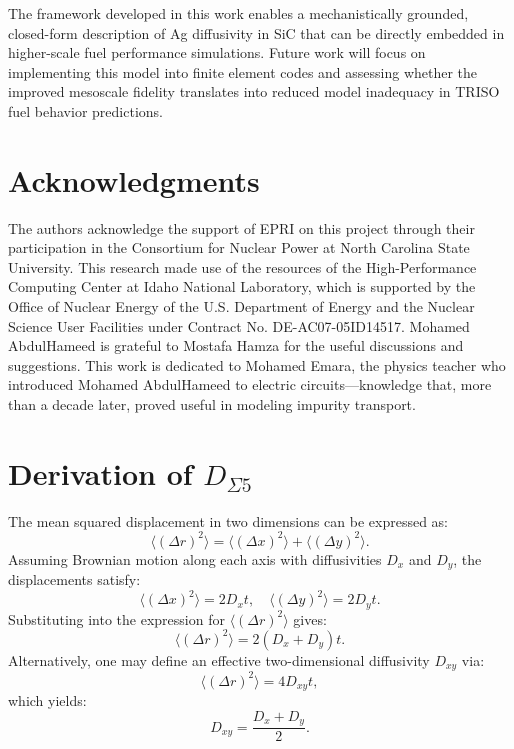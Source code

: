 \documentclass[%
preprint,
amsmath,amssymb,
aps,
]{revtex4-2}
\newcommand{\?}{\stackrel{?}{=}}
\begin{document}
The framework developed in this work enables a mechanistically grounded, closed-form description of Ag diffusivity in SiC that can be directly embedded in higher-scale fuel performance simulations. Future work will focus on implementing this model into finite element codes and assessing whether the improved mesoscale fidelity translates into reduced model inadequacy in TRISO fuel behavior predictions.

\section{Acknowledgments}

The authors acknowledge the support of EPRI on this project through their participation in the Consortium for Nuclear Power at North Carolina State University. This research made use of the resources of the High-Performance Computing Center at Idaho National Laboratory, which is supported by the Office of Nuclear Energy of the U.S. Department of Energy and the Nuclear Science User Facilities under Contract No. DE-AC07-05ID14517. Mohamed AbdulHameed is grateful to Mostafa Hamza for the useful discussions and suggestions. This work is dedicated to Mohamed Emara, the physics teacher who introduced Mohamed AbdulHameed to electric circuits---knowledge that, more than a decade later, proved useful in modeling impurity transport.

\appendix

\section{Derivation of $D_{\Sigma 5}$}
\label{app}

The mean squared displacement in two dimensions can be expressed as:
\begin{equation}
\langle (\Delta r)^2 \rangle = \langle (\Delta x)^2 \rangle + \langle (\Delta y)^2 \rangle.
\end{equation}
Assuming Brownian motion along each axis with diffusivities $D_x$ and $D_y$, the displacements satisfy:
\begin{equation}
\langle (\Delta x)^2 \rangle = 2 D_x t, \quad \langle (\Delta y)^2 \rangle = 2 D_y t.
\end{equation}
Substituting into the expression for $\langle (\Delta r)^2 \rangle$ gives:
\begin{equation}
\langle (\Delta r)^2 \rangle = 2(D_x + D_y)t.
\end{equation}
Alternatively, one may define an effective two-dimensional diffusivity $D_{xy}$ via:
\begin{equation}
\langle (\Delta r)^2 \rangle = 4 D_{xy} t,
\end{equation}
which yields:
\begin{equation}
D_{xy} = \frac{D_x + D_y}{2}.
\label{Eq:Dxy}
\end{equation}
\end{document}
